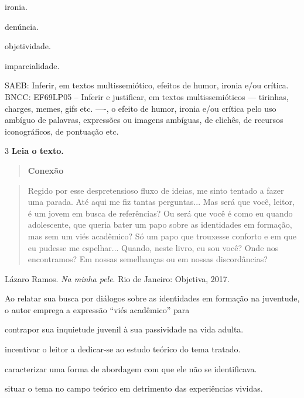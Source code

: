 \begin{escolha}
\item ironia.

\item denúncia.

\item objetividade.

\item imparcialidade.
\end{escolha}

SAEB: Inferir, em textos multissemiótico, efeitos de humor, ironia e/ou
crítica. BNCC: EF69LP05 -- Inferir e justificar, em textos
multissemióticos --- tirinhas, charges, memes, gifs etc. ----, o efeito
de humor, ironia e/ou crítica pelo uso ambíguo de palavras, expressões
ou imagens ambíguas, de clichês, de recursos iconográficos, de pontuação
etc.

\num{3} \textbf{Leia o texto.}

\begin{quote}
\textbf{Conexão}
\end{quote}

\begin{quote}
Regido por esse despretensioso fluxo de ideias, me sinto tentado a fazer
uma parada. Até aqui me fiz tantas perguntas... Mas será que você,
leitor, é um jovem em busca de referências? Ou será que você é como eu
quando adolescente, que queria bater um papo sobre as identidades em
formação, mas sem um viés acadêmico? Só um papo que trouxesse conforto e
em que eu pudesse me espelhar... Quando, neste livro, eu sou você? Onde
nos encontramos? Em nossas semelhanças ou em nossas discordâncias?
\end{quote}

Lázaro Ramos. \emph{Na minha pele}. Rio de Janeiro: Objetiva, 2017.

Ao relatar sua busca por diálogos sobre as identidades em formação na
juventude, o autor emprega a expressão ``viés acadêmico'' para

\begin{escolha}
\item contrapor sua inquietude juvenil à sua passividade na vida adulta.

\item incentivar o leitor a dedicar-se ao estudo teórico do tema tratado.

\item caracterizar uma forma de abordagem com que ele não se identificava.

\item situar o tema no campo teórico em detrimento das experiências
vividas.
\end{escolha}


